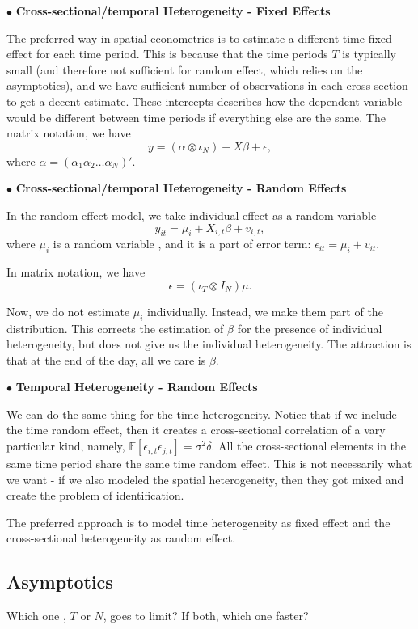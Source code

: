 \documentclass[11pt,a4paper]{amsart}
\theoremstyle{plain}
\theoremstyle{definition}
\begin{document}
$\bullet$ \textbf{Cross-sectional/temporal Heterogeneity - Fixed Effects}\hfill\par 
 The preferred way in spatial econometrics is to estimate a different time fixed effect for each time period. This is because that the time periods $T$ is typically small (and therefore not sufficient for random effect, which relies on the asymptotics), and we have sufficient number of observations in each cross section to get a decent estimate. These intercepts describes how the dependent variable would be different between time periods if everything else are the same. The matrix notation, we have 
 \[	y = (\alpha \otimes \iota_{N}) + X\beta + \epsilon,	\]
where $\alpha = (\alpha_{1} \alpha_{2} \dots \alpha_{N})'$.

$\bullet$ \textbf{Cross-sectional/temporal Heterogeneity - Random Effects}\hfill\par 
In the random effect model, we take individual effect as a random variable
\[	y_{it} = \mu_{i} + X_{i,t}\beta + v_{i,t},	\]
where $\mu_{i}$ is a random variable , and it is a part of error term: $\epsilon_{it} = \mu_{i} + v_{it}$.

In matrix notation, we have 
\[	\epsilon = (\iota_{T} \otimes I_{N})\mu.	\] 

Now, we do not estimate $\mu_{i}$ individually. Instead, we make them part of the distribution. This corrects the estimation of $\beta$ for the presence of individual heterogeneity, but does not give us the individual heterogeneity. The attraction is that at the end of the day, all we care is $\beta$. 

$\bullet$ \textbf{Temporal Heterogeneity - Random Effects}\hfill\par 
We can do the same thing for the time heterogeneity. Notice that if we include the time random effect, then it creates a cross-sectional correlation of a vary particular kind, namely, $\mathbb{E}[\epsilon_{i,t}\epsilon_{j,t}] = \sigma^{2}\delta$. All the cross-sectional elements in the same time period share the same time random effect. This is not necessarily what we want - if we also modeled the spatial heterogeneity, then they got mixed and create the problem of identification.

The preferred approach is to model time heterogeneity as fixed effect and the cross-sectional heterogeneity as random effect.

\subsection{Asymptotics}\hfill\par 
Which one , $T$ or $N$, goes to limit? If both, which one faster?
\end{document}
